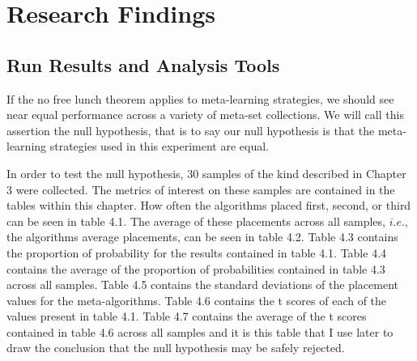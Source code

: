 \chapter{Research Findings}
\label{Chapter4}
\section{Run Results and Analysis Tools}
If the no free lunch theorem applies to  meta-learning strategies, we
should see near equal performance across a variety of meta-set collections.
We will call this assertion the null hypothesis, that is to say our null
hypothesis is that the meta-learning strategies used in this experiment
are equal.

In order to test the null hypothesis, 30 samples of the kind described
in Chapter 3 were collected. The metrics of interest on these samples are
contained in the tables within this chapter. How often the algorithms placed
first, second, or third can be seen in table 4.1. The average of these
placements across all samples, $i.e.$, the algorithms average placements, can be
seen in table 4.2. Table 4.3 contains the proportion of probability for the
results contained in table 4.1. Table 4.4 contains the average of the
proportion of probabilities contained in table 4.3 across all samples.
Table 4.5 contains the standard deviations of the placement values for the
meta-algorithms. Table 4.6 contains the t scores of each of the values present
in table 4.1. Table 4.7 contains the average of the t scores contained in
table 4.6 across all samples and it is this table that I use later to draw the
conclusion that the null hypothesis may be safely rejected.

